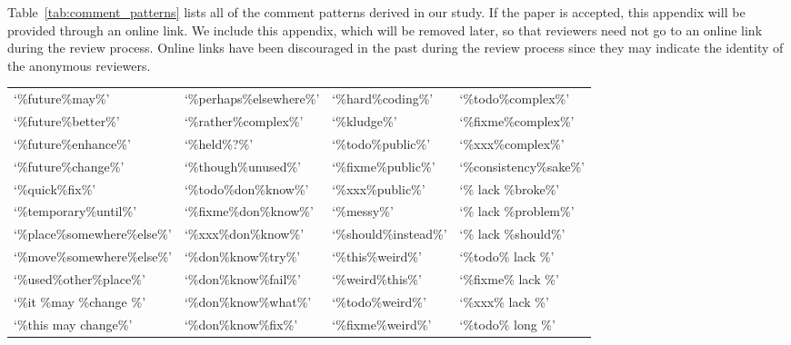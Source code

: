\appendix{}
\label{sec:appendix}

Table~\ref{tab:comment_patterns} lists all of the comment patterns derived in our study. If the paper is accepted, this appendix will be provided through an online link. We include this appendix, which will be removed later, so that reviewers need not go to an online link during the review process. Online links have been discouraged in the past during the review process since they may indicate the identity of the anonymous reviewers.


\begin{table*}[thb!]
	\begin{center}
		\caption{The Derived 176 Comment Patterns that Indicate \SADTD}
		\label{tab:comment_patterns}
		\begin{tabular}{l| l| l| l }
			\toprule
			`\%future\%may\%'            & `\%perhaps\%elsewhere\%'    & `\%hard\%coding\%'            & `\%todo\%complex\%'       \\
			`\%future\%better\%'         & `\%rather\%complex\%'       & `\%kludge\%'                  & `\%fixme\%complex\%'      \\
			`\%future\%enhance\%'        & `\%held\%?\%'               & `\%todo\%public\%'            & `\%xxx\%complex\%'        \\
			`\%future\%change\%'         & `\%though\%unused\%'        & `\%fixme\%public\%'           & `\%consistency\%sake\%'   \\
			`\%quick\%fix\%'             & `\%todo\%don\%know\%'       & `\%xxx\%public\%'             & `\% lack \%broke\%'       \\
			`\%temporary\%until\%'       & `\%fixme\%don\%know\%'      & `\%messy\%'                   & `\% lack \%problem\%'     \\
			`\%place\%somewhere\%else\%' & `\%xxx\%don\%know\%'        & `\%should\%instead\%'         & `\% lack \%should\%'      \\
			`\%move\%somewhere\%else\%'  & `\%don\%know\%try\%'        & `\%this\%weird\%'             & `\%todo\% lack \%'        \\
			`\%used\%other\%place\%'     & `\%don\%know\%fail\%'       & `\%weird\%this\%'             & `\%fixme\% lack \%'       \\
			`\%it \%may \%change \%'     & `\%don\%know\%what\%'       & `\%todo\%weird\%'             & `\%xxx\% lack \%'         \\
			`\%this may change\%'        & `\%don\%know\%fix\%'        & `\%fixme\%weird\%'            & `\%todo\% long \%'        \\

\end{tabular}
\end{center}
\end{table*}
